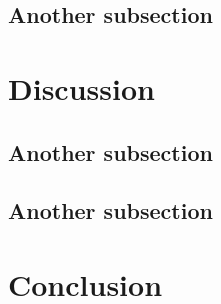 \documentclass[a4paper, 10pt, conference]{article}
\begin{document}
\begin{multicols}{2}
\subsection{Another subsection}
\lipsum[1-4]

\section{Discussion}

\subsection{Another subsection}
\lipsum[1-4]

\subsection{Another subsection}
\lipsum[1-2]

\section{Conclusion}
\lipsum[2-2]

     




\end{multicols}


\label{lastPage} %
\end{document}
